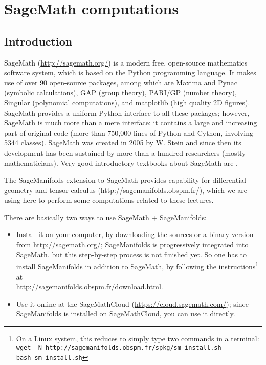 \chapter{SageMath computations} \label{s:sam}

\minitoc

\section{Introduction}


\textsf{SageMath} (\url{http://sagemath.org/}) is a modern free,
open-source mathematics software system, which is
based on the Python programming language. It makes use of over 90 open-source packages,
among which are \textsf{Maxima} and \textsf{Pynac} (symbolic calculations),
\textsf{GAP} (group theory),
\textsf{PARI/GP} (number theory), \textsf{Singular} (polynomial computations),
and \textsf{matplotlib} (high quality 2D figures).
\textsf{SageMath} provides a uniform Python interface to all these packages; however,
\textsf{SageMath} is much more than a mere interface: it contains a large and increasing part of
original code (more than 750,000 lines of Python and Cython, involving 5344 classes).
\textsf{SageMath} was created in 2005 by W. Stein \cite{SteinJ05} and since
then its development has been sustained by more than a hundred researchers
(mostly mathematicians). Very good introductory textbooks about \textsf{SageMath} are
\cite{JoyneS14,Zimme13,Bard15}.

The \textsf{SageManifolds} extension to
\textsf{SageMath} provides capability for differential geometry and tensor calculus
(\url{http://sagemanifolds.obspm.fr/}), which we are using here to perform
some computations related to these lectures.

There are basically two ways to use \textsf{SageMath} + \textsf{SageManifolds}:
\begin{itemize}
\item Install it on your computer, by downloading the sources or a binary version
from \url{http://sagemath.org/}; \textsf{SageManifolds} is progressively integrated
into \textsf{SageMath}, but this step-by-step process is not finished yet. So
one has to install \textsf{SageManifolds} in addition to \textsf{SageMath}, by
following the instructions\footnote{On a Linux system, this reduces to simply type
two commands in a terminal:\\
\texttt{wget -N http://sagemanifolds.obspm.fr/spkg/sm-install.sh}\\
\texttt{bash sm-install.sh}}
at \\ \url{http://sagemanifolds.obspm.fr/download.html}.
\item Use it online at the \textsf{SageMathCloud} (\url{https://cloud.sagemath.com/});
since \textsf{SageManifolds} is installed on \textsf{SageMathCloud}, you can
use it directly.
\end{itemize}

